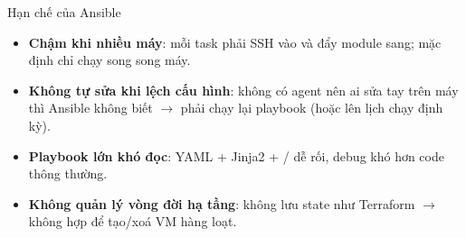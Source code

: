 \documentclass[aspectratio=169,11pt,xcolor=table]{beamer}
\begin{document}
\begin{frame}{Hạn chế của Ansible}
  \begin{itemize}\setlength{\itemsep}{0.3cm}
    \item \textbf{Chậm khi nhiều máy}: mỗi task phải SSH vào và đẩy module sang;
          mặc định chỉ chạy song song  máy.
    \item \textbf{Không tự sửa khi lệch cấu hình}: không có agent nên ai sửa tay trên máy
          thì Ansible không biết $\rightarrow$ phải chạy lại playbook (hoặc lên lịch chạy định kỳ).
    \item \textbf{Playbook lớn khó đọc}: YAML + Jinja2 + / dễ rối,
          debug khó hơn code thông thường.
    \item \textbf{Không quản lý vòng đời hạ tầng}: không lưu state như Terraform
          $\rightarrow$ không hợp để tạo/xoá VM hàng loạt.
  \end{itemize}
\end{frame}
\end{document}
